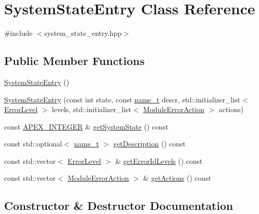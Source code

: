 \hypertarget{classSystemStateEntry}{}\section{System\+State\+Entry Class Reference}
\label{classSystemStateEntry}


{\ttfamily \#include $<$system\+\_\+state\+\_\+entry.\+hpp$>$}

\subsection*{Public Member Functions}
\begin{DoxyCompactItemize}
\item 
\hyperlink{classSystemStateEntry_a621a38a75af548dcbbc5277a83e8deb6}{System\+State\+Entry} ()
\item 
\hyperlink{classSystemStateEntry_a0a74b9458cd8a013705d21ca55fbe8b6}{System\+State\+Entry} (const int state, const \hyperlink{structname__t}{name\+\_\+t} descr, std\+::initializer\+\_\+list$<$ \hyperlink{classErrorLevel}{Error\+Level} $>$ levels, std\+::initializer\+\_\+list$<$ \hyperlink{classModuleErrorAction}{Module\+Error\+Action} $>$ actions)
\item 
const \hyperlink{apex__types_8h_a4e13487a80a5740717e19f7f693e06c3}{A\+P\+E\+X\+\_\+\+I\+N\+T\+E\+G\+ER} \& \hyperlink{classSystemStateEntry_a5ebc8e3bee3c3c1d14dfaaaaa22a3aec}{get\+System\+State} () const 
\item 
const std\+::optional$<$ \hyperlink{structname__t}{name\+\_\+t} $>$ \hyperlink{classSystemStateEntry_af945076dacd4cca766689a9e78a3fcaa}{get\+Description} () const 
\item 
const std\+::vector$<$ \hyperlink{classErrorLevel}{Error\+Level} $>$ \& \hyperlink{classSystemStateEntry_a6589d33fa37279644eb4ba95e2d7dd9c}{get\+Error\+Id\+Levels} () const 
\item 
const std\+::vector$<$ \hyperlink{classModuleErrorAction}{Module\+Error\+Action} $>$ \& \hyperlink{classSystemStateEntry_af63741f0dadbf3fcb95b2c32e7b79886}{get\+Actions} () const 
\end{DoxyCompactItemize}


\subsection{Constructor \& Destructor Documentation}
